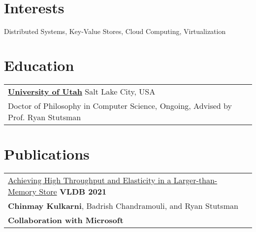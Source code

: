 \documentclass[margin,line]{res}
\begin{document}
\name{Chinmay Kulkarni (www.chinmayk.net, github.com/chinkulkarni) %
}
\begin{resume}

\section{\sc Interests}
Distributed Systems, Key-Value Stores, Cloud Computing, Virtualization

\section{\sc Education}
 \begin{tabular}{@{}p{5.5in}p{4in}}
  {\bf \href{http://www.cs.utah.edu/}{University of Utah}} \dotfill Salt Lake City,
  USA \\
 {\small Doctor of Philosophy in Computer Science, Ongoing, Advised by Prof. Ryan Stutsman}
 \end{tabular}

\section{\sc Publications}
 \begin{tabular}{@{}p{5.5in}p{4in}}
 \href{https://microsoft.github.io/FASTER/}{Achieving High Throughput and
 Elasticity in a Larger-than-Memory Store} \hfill
 {\small\bf VLDB 2021}\\
 {\small {\bf Chinmay Kulkarni}, Badrish Chandramouli, and Ryan
 Stutsman}\\
 {\small\bf Collaboration with Microsoft}\\
 \end{tabular}


\end{resume}
\end{document}
